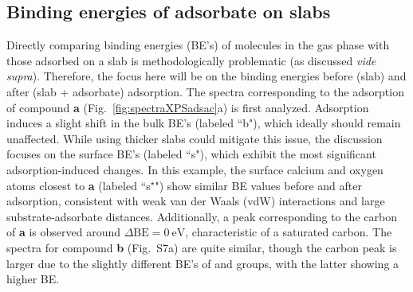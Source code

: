 \documentclass[journal=jpccck,manuscript=article]{achemso}
\def\dbe{\ensuremath{\Delta\text{BE}}}
\begin{document}
\subsection{Binding energies of adsorbate on slabs}

\newcommand{\XPSsa}[2]{
	\begin{figure}[!h]
		\centering
		\texttt{[image: Figure\#1]}
		\caption{Difference (dotted line) between the XPS spectra before (dashed line) and after (solid line) adsorption for compounds \textbf{#2} on various substrates, as computed using the \cpx{E_\infty} protocol. Letters indicate mean binding energies for bulk (``b"), surface (``s", with $\star$ marking the atom closest to the adsorbate), surface hydroxides (``h"), and different atoms of the adsorbate.}
		\label{fig:spectraXPSads#2}
	\end{figure}
}

\newcommand{\XPSsab}[4]{
	\begin{figure}[p]
		\centering
		\texttt{[image: Figure\#1]}
		\texttt{[image: Figure\#2]}
		\caption{Difference (dotted line) between the XPS spectra before (dashed line) and after (solid line) adsorption for compounds \textbf{#3} (panel a) and \textbf{#4} (panel b) on various substrates, as computed using the \cpx{E_\infty} protocol. Letters indicate mean binding energies for bulk (``b"), surface (``s", with $\star$ marking the atom closest to the adsorbate), surface hydroxides (``h"), and different atoms of the adsorbate.}
		\label{fig:spectraXPSads#3#4}
	\end{figure}
}

Directly comparing binding energies (BE's) of molecules in the gas phase with those adsorbed on a slab is methodologically problematic (as discussed \textit{vide supra}). Therefore, the focus here will be on the binding energies before (slab) and after (slab + adsorbate) adsorption.
The spectra corresponding to the adsorption of compound \textbf{a} (Fig.~\ref{fig:spectraXPSadsac}a) is first analyzed. Adsorption induces a slight shift in the bulk BE's (labeled ``b"), which ideally should remain unaffected. While using thicker slabs could mitigate this issue, the discussion  focuses on the surface BE's (labeled ``s"), which exhibit the most significant adsorption-induced changes. In this example, the surface calcium and oxygen atoms closest to \textbf{a} (labeled ``s$^\star$") show similar BE values before and after adsorption, consistent with weak van der Waals (vdW) interactions and large substrate-adsorbate distances. Additionally, a peak corresponding to the carbon of \textbf{a} is observed around $\dbe = \SI{0}{\electronvolt}$, characteristic of a saturated carbon. The spectra for compound \textbf{b} (Fig.~S7a) are quite similar, though the carbon peak is larger due to the slightly different BE's of  and  groups, with the latter showing a higher BE.
\end{document}

